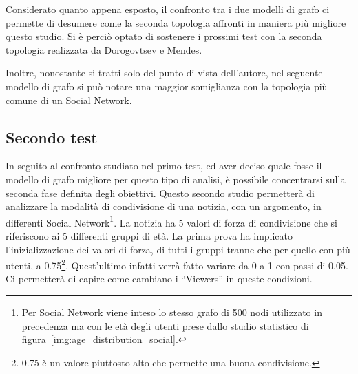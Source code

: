 Considerato quanto appena esposto, il confronto tra i due modelli di grafo ci permette di desumere come la seconda topologia 
affronti in maniera più migliore questo studio.
Si è perciò optato di sostenere i prossimi test con la seconda topologia realizzata da Dorogovtsev e Mendes.

Inoltre, nonostante si tratti solo del punto di vista dell'autore, nel seguente modello di grafo si può notare una 
maggior somiglianza con la topologia più comune di un Social Network.

\subsection{Secondo test}
\label{section:second_test}

In seguito al confronto studiato nel primo test, ed aver deciso quale fosse il modello di grafo migliore per questo tipo di analisi, 
è possibile concentrarsi sulla seconda fase definita degli obiettivi.
Questo secondo studio permetterà di analizzare la modalità di condivisione di una notizia, con un argomento, in differenti 
Social Network\footnote{\scriptsize Per Social Network viene inteso lo stesso grafo di 500 nodi utilizzato in precedenza 
ma con le età degli utenti prese dallo studio statistico di figura~\ref{img:age_distribution_social}.}.
La notizia ha 5 valori di forza di condivisione che si riferiscono ai 5 differenti gruppi di età. 
La prima prova ha implicato l'inizializzazione dei valori di forza, di tutti i gruppi tranne che per quello con più utenti, a
0.75\footnote{\scriptsize 0.75 è un valore piuttosto alto che permette una buona condivisione.}.
Quest'ultimo infatti verrà fatto variare da 0 a 1 con passi di 0.05.
Ci permetterà di capire come cambiano i ``Viewers'' in queste condizioni.

